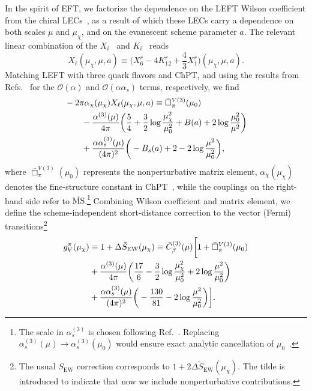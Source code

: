 \documentclass[prl,twocolumn,twoside,preprintnumbers,superscriptaddress,nofootinbib,letterpaper]{revtex4-1}
\newcommand{\Order}{\mathcal{O}}
\newcommand{\beq}{\begin{equation}}
\newcommand{\eeq}{\end{equation}}
\begin{document}
In the spirit of EFT,
we  factorize the dependence on the LEFT Wilson coefficient from the chiral LECs~\cite{Cirigliano:2023fnz}, as a result of which these LECs carry a dependence on both scales $\mu$ and $\mu_\chi$, and on the evanescent scheme parameter $a$. The relevant linear combination of the $X_i$~\cite{Knecht:1999ag} and $K_i$~\cite{Urech:1994hd} reads
\beq
X_\ell(\mu_\chi,\mu, a)
\equiv \bigg(X_6^r -4K_{12}^r+\frac{4}{3}X_1^r\bigg)(\mu_\chi,\mu, a).
\label{eq:LECs}
\eeq
Matching LEFT with three  quark flavors and ChPT,
and using the results from Refs.~\cite{Cirigliano:2023fnz,Gorbahn:2025ssv}
for the $\Order(\alpha)$ and $\Order (\alpha \alpha_s)$ terms, respectively,
we find
\begin{align}
& -2\pi\alpha_\chi(\mu_\chi)  X_\ell (\mu_\chi, \mu,a)  \equiv   \bar\Box^{V(3)}_\pi(\mu_0)
\notag \\
 & \qquad   -\frac{\alpha^{(3)}(\mu)}{4\pi}\bigg(\frac{5}{4}+\frac{3}{2}\log\frac{\mu_\chi^2}{\mu_0^2}+ B(a)
 +2\log\frac{\mu_0^2}{\mu^2}\bigg)
 \notag \\
 & \qquad + \frac{\alpha\alpha_{s}^{(3)}(\mu)}{(4\pi)^2}\bigg(-B_{s}(a)
 +2-2\log\frac{\mu^2}{\mu_{0}^{2}}\bigg),
   \label{eq:final_res0}
\end{align}
where
$\bar \Box_\pi^{V(3)} (\mu_0)$ represents the nonperturbative matrix element,
$\alpha_\chi(\mu_\chi)$ denotes the fine-structure constant in ChPT~\cite{Cirigliano:2023fnz}, while the couplings on the right-hand side refer to $\overline{\text{MS}}$.\footnote{The scale in $\alpha_s^{(3)}$ is chosen following
Ref.~\cite{Gorbahn:2025ssv}.
Replacing $\alpha^{(3)}_s (\mu) \to \alpha^{(3)}_s (\mu_0)$
would ensure exact analytic cancellation of $\mu_0$~\cite{Cirigliano:2023fnz}.}
Combining Wilson coefficient and matrix element, we define the scheme-independent short-distance correction to the vector (Fermi)
transitions\footnote{
The usual  $S_\text{EW}$ correction  corresponds to $1 + 2 \Delta \tilde S_\text{EW}(\mu_\chi)$.
The tilde is introduced to indicate that now we include nonperturbative contributions.}
\begin{align}
g_V^\pi (\mu_\chi)  & \equiv 1+\Delta \tilde S_\text{EW}(\mu_\chi)\equiv
\bar C^{(3)}_\beta  (\mu)
\bigg[1+\bar\Box^{V(3)}_\pi(\mu_0)\notag\\
&+ \frac{\alpha^{(3)} (\mu)}{4 \pi}
  \bigg( \frac{17}{6}
  - \frac{3}{2}  \log \frac{\mu_\chi^2}{\mu_0^2}
 + 2  \log\frac{\mu^2}{\mu_0^2}
  \bigg)\notag\\
&+  \frac{\alpha \alpha_s^{(3)} (\mu)}{(4 \pi)^2}
 \bigg(
 - \frac{130}{81}  -  2  \log\frac{\mu^2}{\mu_0^2}
 \bigg)\bigg].
   \label{eq:final_res}
\end{align}
\end{document}

